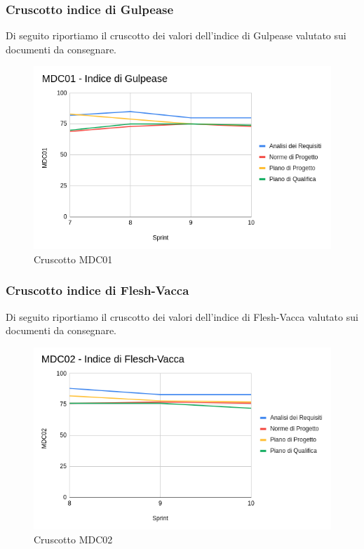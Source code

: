 \subsubsection{Cruscotto indice di Gulpease}
Di seguito riportiamo il cruscotto dei valori dell'indice di Gulpease valutato sui documenti da consegnare. 
\begin{figure}[H]
    \centering
    \includegraphics[scale = 0.63]{immagini/cruscottoRQ.png}
    \caption{Cruscotto MDC01}
    \label{fig:Rappresentazione del modello agile}
\end{figure}
\subsubsection{Cruscotto indice di Flesh-Vacca}
Di seguito riportiamo il cruscotto dei valori dell'indice di Flesh-Vacca valutato sui documenti da consegnare.
\begin{figure}[H]
    \centering
    \includegraphics[scale = 0.63]{immagini/cruscottoFleshRQ.png}
    \caption{Cruscotto MDC02}
    \label{fig:Rappresentazione del modello agile}
\end{figure}